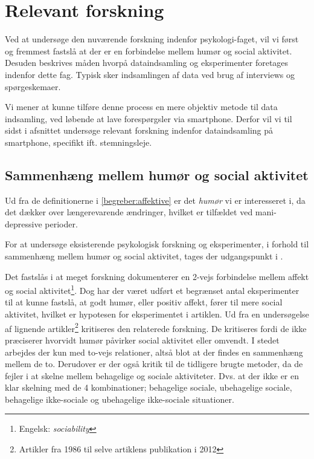 

\chapter{Relevant forskning}
Ved at undersøge den nuværende forskning indenfor psykologi-faget, vil vi først og fremmest fastslå at der er en forbindelse mellem humør og social aktivitet.
Desuden beskrives måden hvorpå dataindsamling og eksperimenter foretages indenfor dette fag.
Typisk sker indsamlingen af data ved brug af interviews og spørgeskemaer.

Vi mener at kunne tilføre denne process en mere objektiv metode til data indsamling, ved løbende at lave forespørgsler via smartphone.
Derfor vil vi til sidst i afsnittet undersøge relevant forskning indenfor dataindsamling på smartphone, specifikt ift. stemningsleje.

\section{Sammenhæng mellem humør og social aktivitet}
Ud fra de definitionerne i \cref{begreber:affektive} er det \textit{humør} vi er interesseret i, da det dækker over længerevarende ændringer, hvilket er tilfældet ved mani-depressive perioder.

For at undersøge eksisterende psykologisk forskning og eksperimenter, i forhold til sammenhæng mellem humør og social aktivitet, tages der udgangspunkt i \citet{whelan}.

Det fastslås i \citet{whelan} at meget forskning dokumenterer en 2-vejs forbindelse mellem affekt og social aktivitet\footnote{Engelsk: \textit{sociability}}.
Dog har der været udført et begrænset antal eksperimenter til at kunne fastslå, at godt humør, eller positiv affekt, fører til mere social aktivitet, hvilket er hypotesen for eksperimentet i artiklen\cite{whelan}.
Ud fra en undersøgelse af lignende artikler\footnote{Artikler fra 1986 til selve artiklens publikation i 2012} kritiseres den relaterede forskning.
De kritiseres fordi de ikke præciserer hvorvidt humør påvirker social aktivitet eller omvendt.
I stedet arbejdes der kun med to-vejs relationer, altså blot at der findes en sammenhæng mellem de to.
Derudover er der også kritik til de tidligere brugte metoder, da de fejler i at skelne mellem behagelige og sociale aktiviteter.
Dvs. at der ikke er en klar skelning med de 4 kombinationer; behagelige sociale, ubehagelige sociale, behagelige ikke-sociale og ubehagelige ikke-sociale situationer.

